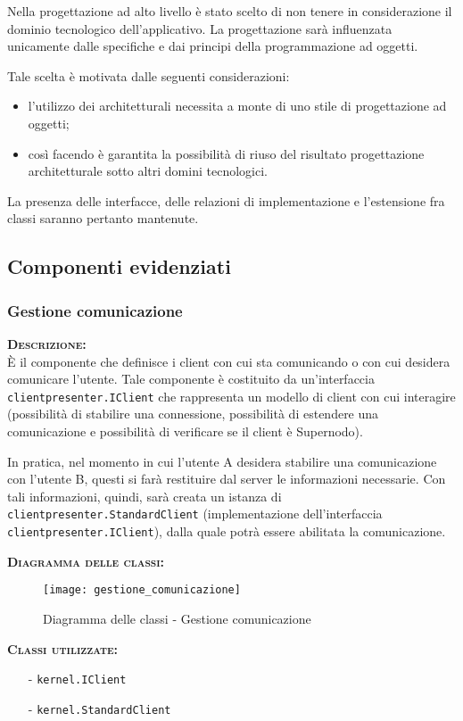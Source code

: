 Nella progettazione ad alto livello è stato scelto di non tenere in considerazione il dominio tecnologico dell'applicativo. La progettazione sarà influenzata unicamente dalle specifiche e dai principi della programmazione ad oggetti.

Tale scelta è motivata dalle seguenti considerazioni:
\begin{itemize}
   \item l'utilizzo dei  architetturali necessita a monte di uno stile di progettazione ad oggetti;
   \item così facendo è garantita la possibilità di riuso del risultato progettazione architetturale sotto altri domini tecnologici.
\end{itemize}

La presenza delle interfacce, delle relazioni di implementazione e l'estensione fra classi saranno pertanto mantenute.

\subsection{Componenti evidenziati}

\subsubsection{Gestione comunicazione}
\begin{description}
	\item{\scshape\bfseries Descrizione:}\\
È il componente che definisce i client con cui sta comunicando o con cui desidera comunicare l'utente. Tale componente è costituito da un'interfaccia \texttt{clientpresenter.IClient} che rappresenta un modello di client con cui interagire (possibilità di stabilire una connessione, possibilità di estendere una comunicazione e possibilità di verificare se il client è Supernodo).

In pratica, nel momento in cui l'utente A desidera stabilire una comunicazione con l'utente B, questi si farà restituire dal server le informazioni necessarie. Con tali informazioni, quindi, sarà creata un istanza di \texttt{clientpresenter.StandardClient} (implementazione dell'interfaccia \texttt{clientpresenter.IClient}), dalla quale potrà essere abilitata la comunicazione.
	\item{\scshape\bfseries Diagramma delle classi:}
	\begin{figure}[H]
\begin{center}
\texttt{[image: gestione\_comunicazione]}
\caption{Diagramma delle classi - Gestione comunicazione}\label{fig:gestione_comunicazione}
\end{center}
\end{figure}
	\item{\scshape\bfseries Classi utilizzate:} 
	\begin{itemize}[noitemsep,nolistsep]
		\item[-] \texttt{kernel.IClient}
		\item[-] \texttt{kernel.StandardClient}
	\end{itemize}  
\end{description}

